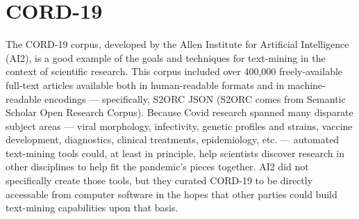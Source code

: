 
\section{CORD-19}\fbeg{}\begin{frame}{}

\begin{ftxt}[.9\textwidth]

The CORD-19 corpus, developed by the Allen Institute for 
Artificial Intelligence (AI2), is a good example of the 
goals and techniques for text-mining in the context of 
scientific research.  This corpus included over 400,000 
freely-available full-text articles available both 
in human-readable formats and in machine-readable 
encodings --- specifically, S2ORC JSON 
(S2ORC comes from Semantic Scholar Open Research Corpus).  
Because Covid research spanned many disparate subject 
areas --- viral morphology, infectivity, genetic profiles 
and strains, vaccine development, diagnostics, clinical 
treatments, epidemiology, etc. --- automated text-mining 
tools could, at least in principle, help scientists 
discover research in other disciplines to help 
fit the pandemic's pieces together.  AI2 did not 
specifically create those tools, but they curated 
CORD-19 to be directly accessable from computer 
software in the hopes that other parties could 
build text-mining capabilities upon that basis.

\end{ftxt}

\end{frame}

